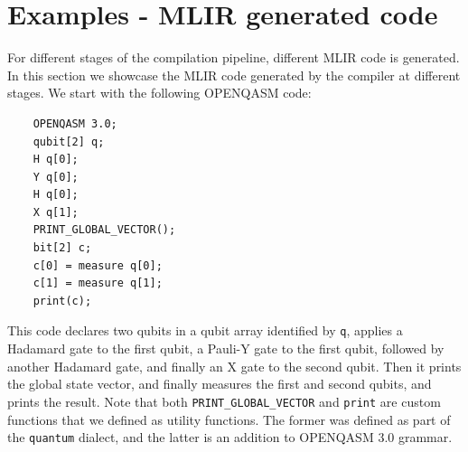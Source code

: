 
\section{Examples - MLIR generated code}
For different stages of the compilation pipeline, different MLIR code is generated.
In this section we showcase the MLIR code generated by the compiler at different stages.
We start with the following OPENQASM code:
\begin{verbatim}
    OPENQASM 3.0;
    qubit[2] q;
    H q[0];
    Y q[0];
    H q[0];
    X q[1];
    PRINT_GLOBAL_VECTOR();
    bit[2] c;
    c[0] = measure q[0];
    c[1] = measure q[1];
    print(c);
\end{verbatim}
This code declares two qubits in a qubit array identified by \texttt{q}, applies a Hadamard gate to the first qubit, a Pauli-Y gate to the first qubit,
followed by another Hadamard gate, and finally an X gate to the second qubit.
Then it prints the global state vector, and finally measures the first and second qubits, and prints the result.
Note that both \texttt{PRINT\_GLOBAL\_VECTOR} and \texttt{print} are custom functions that we defined as utility functions.
The former was defined as part of the \texttt{quantum} dialect, and the latter is an addition to OPENQASM 3.0 grammar.

